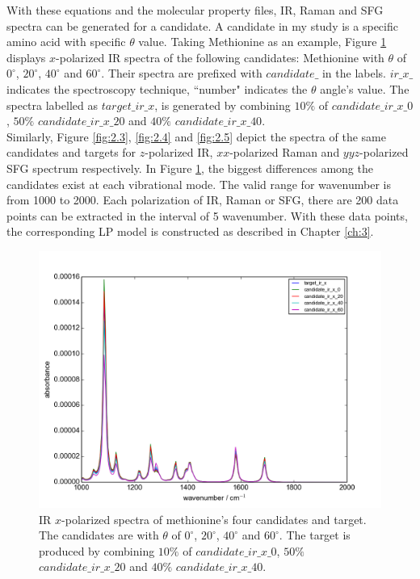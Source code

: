 With these equations and the molecular property files, IR, Raman and SFG spectra can be generated for a candidate. A candidate in my study is a specific amino acid with specific $\theta$ value. Taking Methionine as an example, Figure \ref{fig:2.2} displays $x$-polarized IR spectra of the following candidates: Methionine with $\theta$ of $0^{\circ}$, $20^{\circ}$, $40^{\circ}$ and $60^{\circ}$. Their spectra are prefixed with $candidate\_$ in the labels. $ir\_x\_$ indicates the spectroscopy technique, ``number" indicates the $\theta$ angle's value. The spectra labelled as $target\_ir\_x$, is generated by combining $10\%$ of $candidate\_ir\_x\_0$, $50\%$ $candidate\_ir\_x\_20$ and $40\%$ $candidate\_ir\_x\_40$. \\

Similarly, Figure \ref{fig:2.3}, \ref{fig:2.4} and \ref{fig:2.5} depict the spectra of the same candidates and targets for $z$-polarized IR, $xx$-polarized Raman and $yyz$-polarized SFG spectrum respectively. In Figure \ref{fig:2.2}, the biggest differences among the candidates exist at each vibrational mode. The valid range for wavenumber is from 1000 to 2000. Each polarization of IR, Raman or SFG, there are 200 data points can be extracted in the interval of 5 wavenumber. With these data points, the corresponding LP model is constructed as described in Chapter \ref{ch:3}.\\

\begin{figure}[!ht]
\centering
\includegraphics[scale=0.5]{Figures/Met_candidates_plotting_ir_x.png}
\caption{IR $x$-polarized spectra of methionine's four candidates and target. The candidates are with $\theta$ of $0^{\circ}$, $20^{\circ}$, $40^{\circ}$ and $60^{\circ}$. The target is produced by combining $10\%$ of $candidate\_ir\_x\_0$, $50\%$ $candidate\_ir\_x\_20$ and $40\%$ $candidate\_ir\_x\_40$. } \label{fig:2.2}
\end{figure}

